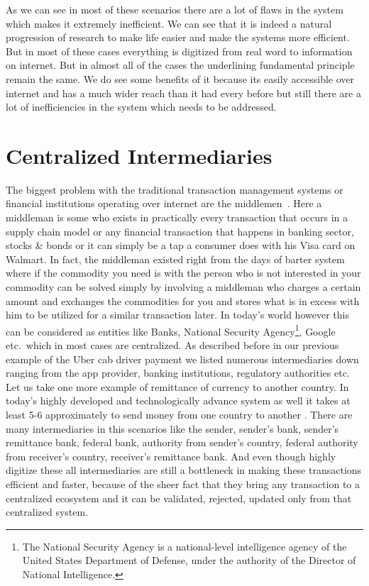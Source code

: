 As we can see in most of these scenarios there are a lot of flaws in
the system which makes it extremely inefficient. We can see that it is
indeed a natural progression of research to make life easier and make
the systems more efficient. But in most of these cases everything is
digitized from real word to information on internet. But in almost all
of the cases the underlining fundamental principle remain the same. We
do see some benefits of it because its easily accessible over internet
and has a much wider reach than it had every before but still there
are a lot of inefficiencies in the system which needs to be addressed.


\section{Centralized Intermediaries}

The biggest problem with the traditional transaction management
systems or financial institutions operating over internet are the
middlemen~\cite{torres10}. Here a middleman is some who exists in
practically every transaction that occurs in a supply chain model or
any financial transaction that happens in banking sector, stocks \&
bonds or it can simply be a tap a consumer does with his Visa card on
Walmart. In fact, the middleman existed right from the days of barter
system where if the commodity you need is with the person who is not
interested in your commodity can be solved simply by involving a
middleman who charges a certain amount and exchanges the commodities
for you and stores what is in excess with him to be utilized for a
similar transaction later. In today's world however this can be
considered as entities like Banks, National Security
Agency\footnote{The National Security Agency is a national-level
  intelligence agency of the United States Department of Defense,
  under the authority of the Director of National Intelligence.},
Google etc.\ which in most cases are centralized. As described before in
our previous example of the Uber cab driver payment we listed numerous
intermediaries down ranging from the app provider, banking
institutions, regulatory authorities etc. Let us take one more example
of remittance of currency to another country. In today's highly
developed and technologically advance system as well it takes at least
5-6 approximately to send money from one country to another
\cite{martinez11}. There are many intermediaries in this scenarios
like the sender, sender's bank, sender's remittance bank, federal
bank, authority from sender's country, federal authority from
receiver's country, receiver's remittance bank. And even though highly
digitize these all intermediaries are still a bottleneck in making
these transactions efficient and faster, because of the sheer fact
that they bring any transaction to a centralized ecosystem and it can
be validated, rejected, updated only from that centralized system.


